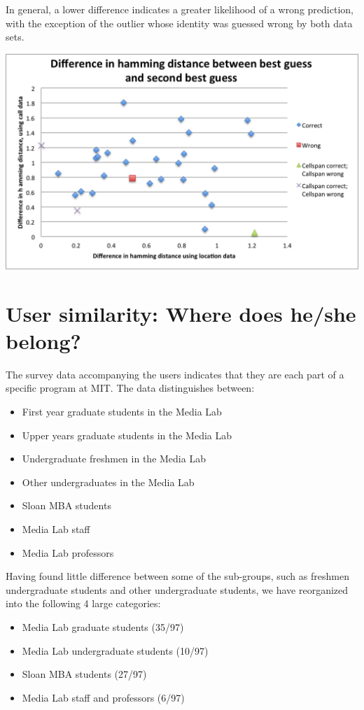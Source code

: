 \documentclass[pageno]{jpaper}
\begin{document}
In general, a lower difference indicates a greater likelihood of a wrong prediction, with the exception of the outlier whose identity was guessed wrong by both data sets. 

\begin{center}
\includegraphics[scale=0.75]{hamming.png}
\end{center}

\section{User similarity: Where does he/she belong?}

The survey data accompanying the users indicates that they are each part of a specific program at MIT. The data distinguishes between:

\begin{itemize}
\item First year graduate students in the Media Lab
\item Upper years graduate students in the Media Lab
\item Undergraduate freshmen in the Media Lab
\item Other undergraduates in the Media Lab
\item Sloan MBA students
\item Media Lab staff
\item Media Lab professors
\end{itemize}

Having found little difference between some of the sub-groups, such as freshmen undergraduate students and other undergraduate students, we have reorganized into the following 4 large categories:

\begin{itemize}
\item Media Lab graduate students (35/97)
\item Media Lab undergraduate students (10/97)
\item Sloan MBA students (27/97)
\item Media Lab staff and professors (6/97)
\end{itemize}
\end{document}
